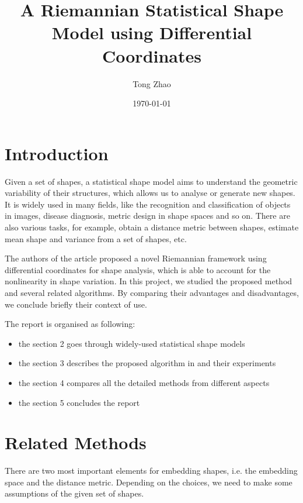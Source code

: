 \documentclass[11pt]{article}
\title{A Riemannian Statistical Shape Model using Differential Coordinates}
\author{Tong Zhao}
\date{\today}
\begin{document}
\maketitle

\tableofcontents
\newpage

\section{Introduction}

Given a set of shapes, a statistical shape model aims to understand the geometric variability of their structures,
which allows us to analyse or generate new shapes. 
It is widely used in many fields, like the recognition and classification of objects in images, disease diagnosis, metric design in shape spaces and so on.
There are also various tasks, for example, obtain a distance metric between shapes, estimate mean shape and variance from a set of shapes, etc.

The authors of the article \cite{Von2017An} proposed a novel Riemannian framework using differential coordinates for shape analysis, which is able to account for the nonlinearity in shape variation.
In this project, we studied the proposed method and several related algorithms.
By comparing their advantages and disadvantages, we conclude briefly their context of use. 

The report is organised as following:

\vspace{-1em}
\begin{itemize}
  \setlength\itemsep{0.1em}
  \item the section 2 goes through widely-used statistical shape models
  \item the section 3 describes the proposed algorithm in \cite{Von2017An} and their experiments
  \item the section 4 compares all the detailed methods from different aspects
  \item the section 5 concludes the report
\end{itemize}
\vspace{-1em}

\section{Related Methods}

There are two most important elements for embedding shapes, i.e. the embedding space and the distance metric.
Depending on the choices, we need to make some assumptions of the given set of shapes.
\end{document}
